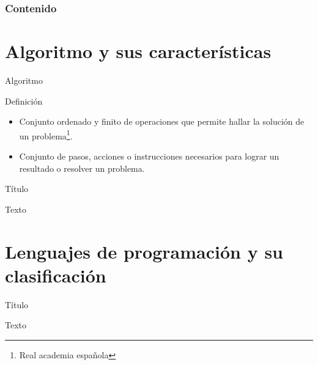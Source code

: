 \begin{frame}
    \frametitle{Contenido}
    \tableofcontents
\end{frame}

\section{Algoritmo y sus características}

\begin{frame}[c]{Algoritmo}
    \begin{block}{Definición}
        \begin{itemize}
            \item Conjunto ordenado y finito de operaciones que permite hallar
                la solución de un problema\footnote{Real academia española}.
            \item Conjunto de pasos, acciones o instrucciones necesarios para
                  lograr un resultado o resolver un problema.
        \end{itemize}
    \end{block}
\end{frame}

\begin{frame}[c]{Título}
    \begin{center}
        Texto
    \end{center}
\end{frame}

\section{Lenguajes de programación y su clasificación}

\begin{frame}[c]{Título}
    \begin{center}
        Texto
    \end{center}
\end{frame}

